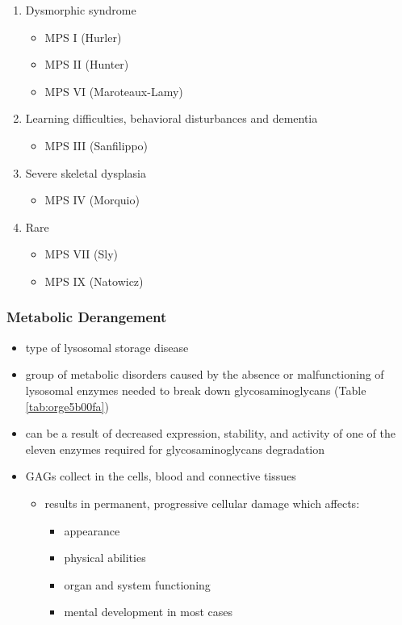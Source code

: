 \documentclass[12pt]{scrartcl}
\begin{document}
\begin{enumerate}
\item Dysmorphic syndrome
\label{sec:orgfd9d4e5}
\begin{itemize}
\item MPS I (Hurler)
\item MPS II (Hunter)
\item MPS VI (Maroteaux-Lamy)
\end{itemize}
\item Learning difficulties, behavioral disturbances and dementia
\label{sec:orgd3c205d}
\begin{itemize}
\item MPS III (Sanfilippo)
\end{itemize}
\item Severe skeletal dysplasia
\label{sec:orgd81c921}
\begin{itemize}
\item MPS IV (Morquio)
\end{itemize}
\item Rare
\label{sec:orgbb936e8}
\begin{itemize}
\item MPS VII (Sly)
\item MPS IX (Natowicz)
\end{itemize}
\end{enumerate}

\subsubsection{Metabolic Derangement}
\label{sec:org946ad31}
\begin{itemize}
\item type of lysosomal storage disease
\item group of metabolic disorders caused by the absence or malfunctioning
of lysosomal enzymes needed to break down glycosaminoglycans (Table \ref{tab:orge5b00fa})
\item can be a result of decreased expression, stability, and activity of
one of the eleven enzymes required for glycosaminoglycans
degradation
\item GAGs collect in the cells, blood and connective tissues
\begin{itemize}
\item results in permanent, progressive cellular damage which affects:
\begin{itemize}
\item appearance
\item physical abilities
\item organ and system functioning
\item mental development in most cases
\end{itemize}
\end{itemize}
\end{itemize}
\end{document}
